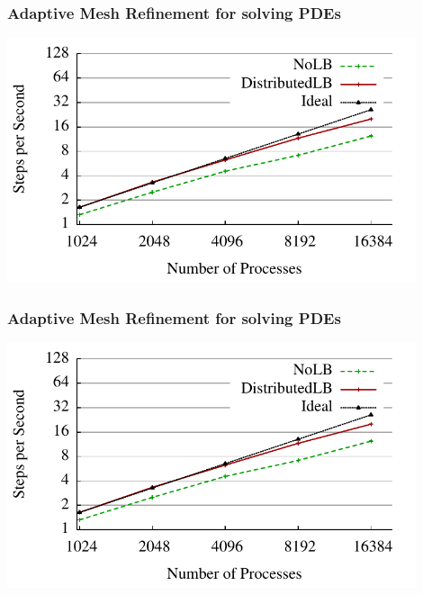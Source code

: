 \begin{frame}
\frametitle{Adaptive Mesh Refinement for solving PDEs}
\includegraphics[width=0.9\textwidth]{../figures/amr_scaling_distlb.pdf}
\end{frame}


\begin{frame}
\frametitle{Adaptive Mesh Refinement for solving PDEs}
\includegraphics[width=0.9\textwidth]{../figures/amr_scaling_distlb.pdf}
\end{frame}



